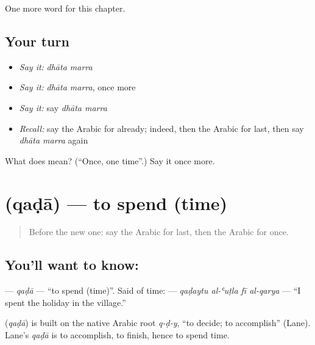 \begin{grammarlens}[title={What you've built}]
One more word for this chapter.
\end{grammarlens}

\subsection*{Your turn}
\begin{itemize}
\raggedright
  \item \emph{Say it:} \emph{dhāta marra}
  \item \emph{Say it:} \emph{dhāta marra}, once more
  \item \emph{Say it:} say \emph{dhāta marra}
  \item \emph{Recall:} say the Arabic for already; indeed, then the Arabic for last, then say \emph{dhāta marra} again
\end{itemize}

\begin{tcolorbox}[breakable,colback=teal!4,colframe=teal!35!black,title={Before you move on}]
What does   mean? (\textquotedblleft{}Once, one time\textquotedblright{}.) Say it once more.
\end{tcolorbox}
\section[\texorpdfstring{\ar{قضى} (qaḍā)}{قضى (qaḍā)}]{ (qaḍā) — to spend (time)}

\label{lesson:AR-C156-qada}



\begin{quote}
Before the new one: say the Arabic for last, then the Arabic for once.
\end{quote}

\subsection*{You'll want to know: }
\textbf{} — \emph{qaḍā} — \textquotedblleft{}to spend (time)\textquotedblright{}. Said of time: \textbf{   } — \emph{qaḍaytu al-ʿuṭla fī al-qarya} — \textquotedblleft{}I spent the holiday in the village.\textquotedblright{}

\begin{cousinweb}
\textbf{} (\emph{qaḍā}) is built on the native Arabic root \emph{q-ḍ-y}, \textquotedblleft{}to decide; to accomplish\textquotedblright{} (Lane). Lane's \emph{qaḍā} is to accomplish, to finish, hence to spend time.
\end{cousinweb}

